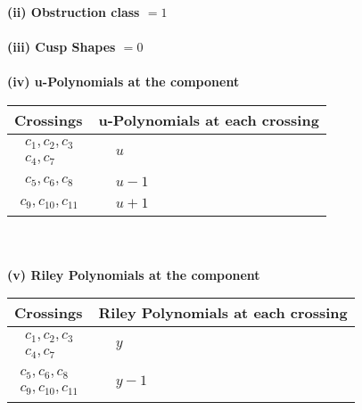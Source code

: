 \documentclass[1p]{elsarticle_modified}
\theoremstyle{definition}
\begin{document}
\flushleft \textbf{(ii) Obstruction class $= 1$}\\~\\
\flushleft \textbf{(iii) Cusp Shapes $= 0$}\\~\\
\newpage\renewcommand{\arraystretch}{1}
\flushleft \textbf{(iv) u-Polynomials at the component}\newline \\
\begin{tabular}{m{50pt}|m{274pt}}
Crossings & \hspace{64pt}u-Polynomials at each crossing \\
\hline $$\begin{aligned}c_{1},c_{2},c_{3}\\c_{4},c_{7}\end{aligned}$$&$\begin{aligned}
&u
\end{aligned}$\\
\hline $$\begin{aligned}c_{5},c_{6},c_{8}\end{aligned}$$&$\begin{aligned}
&u-1
\end{aligned}$\\
\hline $$\begin{aligned}c_{9},c_{10},c_{11}\end{aligned}$$&$\begin{aligned}
&u+1
\end{aligned}$\\
\hline
\end{tabular}\\~\\
\newpage\renewcommand{\arraystretch}{1}
\flushleft \textbf{(v) Riley Polynomials at the component}\newline \\
\begin{tabular}{m{50pt}|m{274pt}}
Crossings & \hspace{64pt}Riley Polynomials at each crossing \\
\hline $$\begin{aligned}c_{1},c_{2},c_{3}\\c_{4},c_{7}\end{aligned}$$&$\begin{aligned}
&y
\end{aligned}$\\
\hline $$\begin{aligned}c_{5},c_{6},c_{8}\\c_{9},c_{10},c_{11}\end{aligned}$$&$\begin{aligned}
&y-1
\end{aligned}$\\
\hline
\end{tabular}\\~\\
\end{document}
